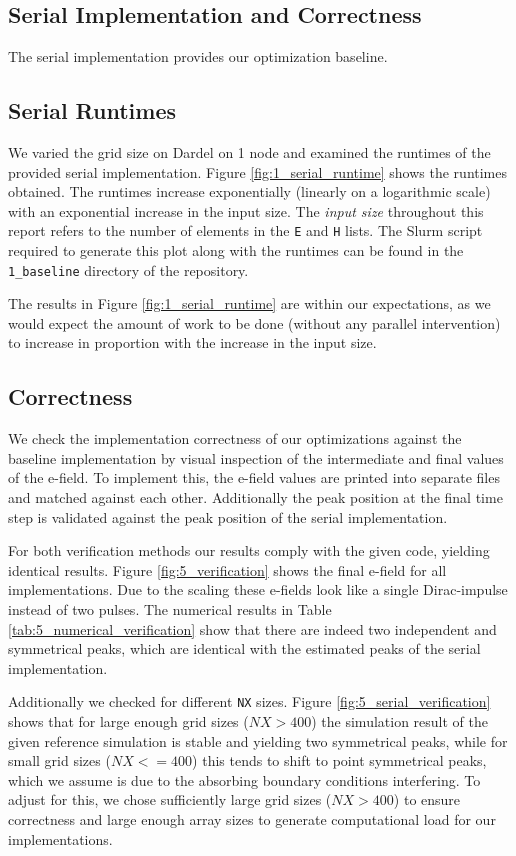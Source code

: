\documentclass[a4paper,10pt]{article}
\begin{document}
\begin{multicols}{2}
\section{Serial Implementation and Correctness}
The serial implementation provides our optimization baseline. 

\subsection{Serial Runtimes}
We varied the grid size on Dardel on 1 node and examined the runtimes of the provided serial implementation. Figure \ref{fig:1_serial_runtime} shows the runtimes obtained. The runtimes increase exponentially (linearly on a logarithmic scale) with an exponential increase in the input size. The \textit{input size} throughout this report refers to the number of elements in the \verb|E| and \verb|H| lists. The Slurm script required to generate this plot along with the runtimes can be found in the \verb|1_baseline| directory of the repository.

The results in Figure \ref{fig:1_serial_runtime} are within our expectations, as we would expect the amount of work to be done (without any parallel intervention) to increase in proportion with the increase in the input size.  

\subsection{Correctness}
We check the implementation correctness of our optimizations against the baseline implementation by visual inspection of the intermediate and final values of the e-field.
To implement this, the e-field values are printed into separate files and matched against each other.
Additionally the peak position at the final time step is validated against the peak position of the serial implementation. 

For both verification methods our results comply with the given code, yielding identical results. Figure \ref{fig:5_verification} shows the final e-field for all implementations. 
Due to the scaling these e-fields look like a single Dirac-impulse instead of two pulses. 
The numerical results in Table \ref{tab:5_numerical_verification} show that there are indeed two independent and symmetrical peaks, which are identical with the estimated peaks of the serial implementation.

Additionally we checked for different \verb|NX| sizes. Figure \ref{fig:5_serial_verification} shows that for large enough grid sizes ($NX > 400$) the simulation result of the given reference simulation is stable and yielding two symmetrical peaks, while for small grid sizes ($NX <= 400$) this tends to shift to point symmetrical peaks, which we assume is due to the absorbing boundary conditions interfering.
To adjust for this, we chose sufficiently large grid sizes ($NX > 400$) to ensure correctness and large enough array sizes to generate computational load for our implementations.


\end{multicols}
\end{document}
